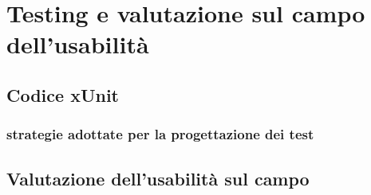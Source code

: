 \chapter{Testing e valutazione sul campo dell'usabilità}
\raggedright{\section{Codice xUnit}}
\raggedright{\subsection{strategie adottate per la progettazione dei test}}

\raggedright{\section{Valutazione dell'usabilità sul campo}}

